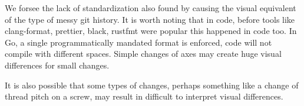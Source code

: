 \documentclass[sigconf]{acmart}
\begin{document}
We forsee the lack of standardization also found by \citet{cheng2023age} causing the visual equivalent of the type of messy git history.
It is worth noting that in code, before tools like clang-format, prettier, black, rustfmt were popular this happened in code too.
In Go, a single programmatically mandated format is enforced, code will not compile with different spaces.
Simple changes of axes may create huge visual differences for small changes.

It is also possible that some types of changes, perhaps something like a change of thread pitch on a screw, may result in difficult to interpret visual differences.




\section{}






\end{document}
